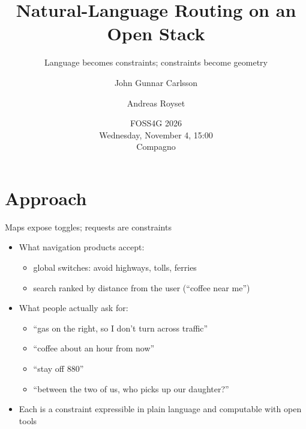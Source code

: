 \documentclass[aspectratio=169]{beamer}
\title{Natural-Language Routing on an Open Stack}
\subtitle{Language becomes constraints; constraints become geometry}
\author{John Gunnar Carlsson \and Andreas Royset}
\date{FOSS4G 2026 \\ Wednesday, November 4, 15:00 \\ Compagno}
\begin{document}
\begin{frame}
  \titlepage
\end{frame}

\section{Approach}

\begin{frame}{Maps expose toggles; requests are constraints}
  \begin{itemize}
    \item What navigation products accept:
      \begin{itemize}
        \item global switches: avoid highways, tolls, ferries
        \item search ranked by distance from the user (``coffee near me'')
      \end{itemize}
    \item What people actually ask for:
      \begin{itemize}
        \item ``gas on the right, so I don't turn across traffic''
        \item ``coffee about an hour from now''
        \item ``stay off 880''
        \item ``between the two of us, who picks up our daughter?''
      \end{itemize}
    \item Each is a constraint expressible in plain language and computable with open tools
  \end{itemize}
\end{frame}
\end{document}
